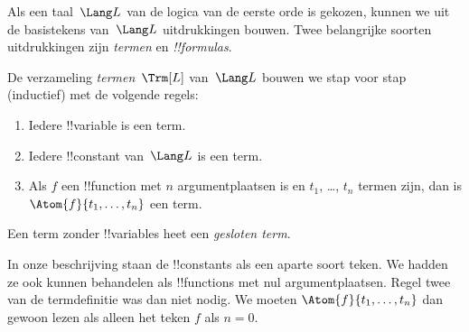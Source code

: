 \documentclass[../../../include/open-logic-section]{subfiles}
\begin{document}


Als een taal~$\Lang L$ van de logica van de eerste orde is gekozen,
kunnen we uit de basistekens van~$\Lang L$ uitdrukkingen bouwen. Twee
belangrijke soorten uitdrukkingen zijn \emph{termen} en
\emph{!!{formula}s}.

\begin{defn}[Termen]
De verzameling \emph{termen}~$\Trm[L]$ van~$\Lang L$ bouwen we stap
voor stap (inductief) met de volgende regels:
\begin{enumerate}
\item Iedere !!{variable} is een term.
\item Iedere !!{constant} van~$\Lang L$ is een term.
\item Als $f$ een !!{function} met $n$ argumentplaatsen is en $t_1$,
  \dots, $t_n$ termen zijn, dan is $\Atom{f}{t_1, \ldots, t_n}$ een
  term.
\end{enumerate}
Een term zonder !!{variable}s heet een \emph{gesloten term}.
\end{defn}

\begin{explain}
In onze beschrijving staan de !!{constant}s als een aparte soort teken.
We hadden ze ook kunnen behandelen als !!{function}s met nul
argumentplaatsen. Regel twee van de termdefinitie was dan niet nodig.
We moeten $\Atom{f}{t_1, \ldots, t_n}$ dan gewoon lezen als alleen het
teken $f$ als $n = 0$.
\end{explain}
\end{document}
